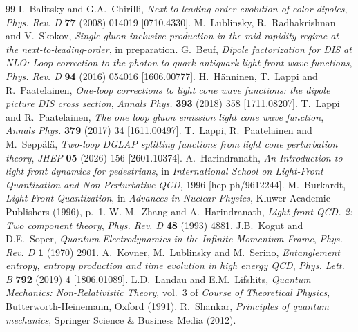 \begin{thebibliography}{99}
 I.~Balitsky and G.A.~Chirilli, \emph{Next-to-leading order evolution of color dipoles}, \emph{Phys. Rev. D} \textbf{77} (2008) 014019 [0710.4330].
 M.~Lublinsky, R.~Radhakrishnan and V.~Skokov, \emph{Single gluon inclusive production in the mid rapidity regime at the next-to-leading-order}, in preparation.
 G.~Beuf, \emph{Dipole factorization for DIS at NLO: Loop correction to the photon to quark-antiquark light-front wave functions}, \emph{Phys. Rev. D} \textbf{94} (2016) 054016 [1606.00777].
 H.~H\"anninen, T.~Lappi and R.~Paatelainen, \emph{One-loop corrections to light cone wave functions: the dipole picture DIS cross section}, \emph{Annals Phys.} \textbf{393} (2018) 358 [1711.08207].
 T.~Lappi and R.~Paatelainen, \emph{The one loop gluon emission light cone wave function}, \emph{Annals Phys.} \textbf{379} (2017) 34 [1611.00497].
 T.~Lappi, R.~Paatelainen and M.~Sepp\"al\"a, \emph{Two-loop DGLAP splitting functions from light cone perturbation theory}, \emph{JHEP} \textbf{05} (2026) 156 [2601.10374].
 A.~Harindranath, \emph{An Introduction to light front dynamics for pedestrians}, in \emph{International School on Light-Front Quantization and Non-Perturbative QCD}, 1996 [hep-ph/9612244].
 M.~Burkardt, \emph{Light Front Quantization}, in \emph{Advances in Nuclear Physics}, Kluwer Academic Publishers (1996), p.~1.
 W.-M.~Zhang and A.~Harindranath, \emph{Light front QCD. 2: Two component theory}, \emph{Phys. Rev. D} \textbf{48} (1993) 4881.
 J.B.~Kogut and D.E.~Soper, \emph{Quantum Electrodynamics in the Infinite Momentum Frame}, \emph{Phys. Rev. D} \textbf{1} (1970) 2901.
 A.~Kovner, M.~Lublinsky and M.~Serino, \emph{Entanglement entropy, entropy production and time evolution in high energy QCD}, \emph{Phys. Lett. B} \textbf{792} (2019) 4 [1806.01089].
 L.D.~Landau and E.M.~Lifshits, \emph{Quantum Mechanics: Non-Relativistic Theory}, vol.~3 of \emph{Course of Theoretical Physics}, Butterworth-Heinemann, Oxford (1991).
 R.~Shankar, \emph{Principles of quantum mechanics}, Springer Science \& Business Media (2012).
\end{thebibliography}
